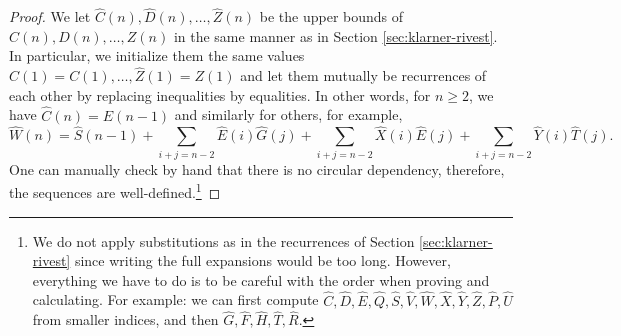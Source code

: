 \documentclass[a4paper,12pt]{article}
\begin{document}
\begin{proof}
	We let $\hat{C}(n),\hat{D}(n),\dots,\hat{Z}(n)$ be the upper bounds of $C(n),D(n),\dots,Z(n)$ in the same manner as in Section \ref{sec:klarner-rivest}. In particular, we initialize them the same values $\hat{C}(1)=C(1),\dots,\hat{Z}(1)=Z(1)$ and let them mutually be recurrences of each other by replacing inequalities by equalities. In other words, for $n\ge 2$, we have $\hat{C}(n) = \hat{E}(n-1)$ and similarly for others, for example,
	\[
		\hat{W}(n) = \hat{S}(n-1) + \sum_{i+j=n-2} \hat{E}(i)\hat{G}(j) + \sum_{i+j=n-2} \hat{X}(i)\hat{E}(j) + \sum_{i+j=n-2} \hat{Y}(i)\hat{T}(j).
	\]
    One can manually check by hand that there is no circular dependency, therefore, the sequences are well-defined.\footnote{We do not apply substitutions as in the recurrences of Section \ref{sec:klarner-rivest} since writing the full expansions would be too long. However, everything we have to do is to be careful with the order when proving and calculating. For example: we can first compute $\hat{C}, \hat{D}, \hat{E}, \hat{Q}, \hat{S}, \hat{V}, \hat{W}, \hat{X}, \hat{Y}, \hat{Z}, \hat{P}, \hat{U}$ from smaller indices, and then $\hat{G}, \hat{F}, \hat{H}, \hat{T}, \hat{R}$.} 


\end{proof}
\end{document}
